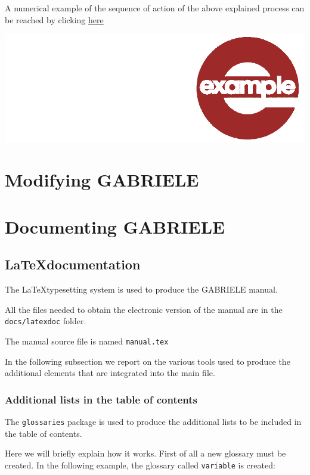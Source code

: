 \documentclass{book}
\newcommand{\doclocation}{file:///Users/giulioni/Documents/workspace/gabriele/docs}
\begin{document}
\vskip1cm
A numerical example of the sequence of action of the above explained process can be reached by clicking \href{\doclocation/umldoc/example_firm_good_conditions.html}{here}
\begin{marginfigure}
\hskip8mm	\includegraphics[scale=0.07]{example.png}
\end{marginfigure}



\part{Modifying GABRIELE}

\part{Documenting GABRIELE}


\chapter{\LaTeX documentation}
The \LaTeX typesetting system is used to produce the GABRIELE manual.

All the files needed to obtain the electronic version of the manual are in the \verb+docs/latexdoc+ folder.

The manual source file is named \verb+manual.tex+

In the following subsection we report on the various tools used to produce the additional elements that are integrated into the main file. 

\section{Additional lists in the table of contents}
The \verb+glossaries+ package is used to produce the additional lists to be included in the table of contents.

Here we will briefly explain how it works. First of all a new glossary must be created. In the following example, the glossary called \verb+variable+ is created: 
\end{document}
